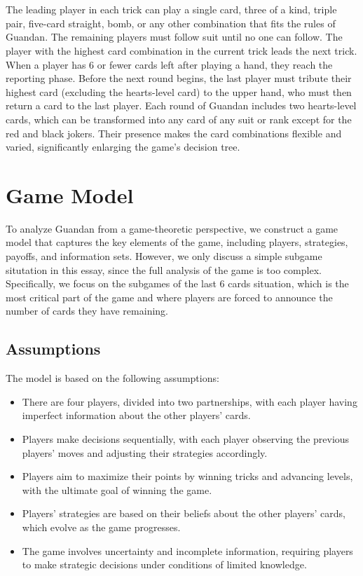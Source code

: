 \documentclass{article}
\begin{document}
\\ \hspace*{\fill} \\
The leading player in each trick can play a single card, three of a kind, triple pair, five-card straight, bomb, or any other combination that fits the rules of Guandan. The remaining players must follow suit until no one can follow. The player with the highest card combination in the current trick leads the next trick. When a player has 6 or fewer cards left after playing a hand, they reach the reporting phase. Before the next round begins, the last player must tribute their highest card (excluding the hearts-level card) to the upper hand, who must then return a card to the last player. Each round of Guandan includes two hearts-level cards, which can be transformed into any card of any suit or rank except for the red and black jokers. Their presence makes the card combinations flexible and varied, significantly enlarging the game’s decision tree.\\
\section{Game Model}
To analyze Guandan from a game-theoretic perspective, we construct a game model that captures the key elements of the game, including players, strategies, payoffs, 
and information sets. However, we only discuss a simple subgame situtation in this essay, since the full analysis of the game is too complex. 
Specifically, we focus on the subgames of the last 6 cards situation, which is the most critical part of the game and where players are forced to announce the number of cards they have remaining.\\
\subsection{Assumptions}
The model is based on the following assumptions:
\begin{itemize}
    \item There are four players, divided into two partnerships, with each player having imperfect information about the other players' cards.
    \item Players make decisions sequentially, with each player observing the previous players' moves and adjusting their strategies accordingly.
    \item Players aim to maximize their points by winning tricks and advancing levels, with the ultimate goal of winning the game.
    \item Players' strategies are based on their beliefs about the other players' cards, which evolve as the game progresses.
    \item The game involves uncertainty and incomplete information, requiring players to make strategic decisions under conditions of limited knowledge.
\end{itemize}
\end{document}
